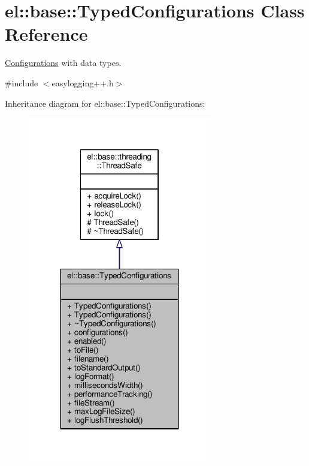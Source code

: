 \hypertarget{classel_1_1base_1_1TypedConfigurations}{}\section{el\+:\+:base\+:\+:Typed\+Configurations Class Reference}
\label{classel_1_1base_1_1TypedConfigurations}


\hyperlink{classel_1_1Configurations}{Configurations} with data types.  




{\ttfamily \#include $<$easylogging++.\+h$>$}



Inheritance diagram for el\+:\+:base\+:\+:Typed\+Configurations\+:
\nopagebreak
\begin{figure}[H]
\begin{center}
\leavevmode
\includegraphics[width=227pt]{d2/d62/classel_1_1base_1_1TypedConfigurations__inherit__graph}
\end{center}
\end{figure}


